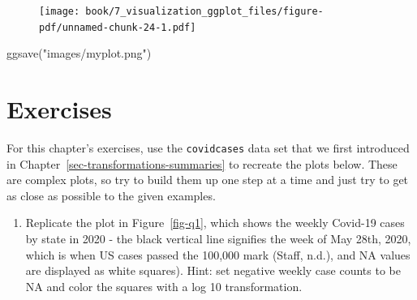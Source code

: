 \documentclass[
  letterpaper,
]{krantz}
\makeatletter
\newenvironment{Shaded}{\begin{snugshade}}{\end{snugshade}}
\newcommand{\FunctionTok}[1]{\textcolor[rgb]{0.28,0.35,0.67}{#1}}
\newcommand{\NormalTok}[1]{\textcolor[rgb]{0.00,0.23,0.31}{#1}}
\newcommand{\StringTok}[1]{\textcolor[rgb]{0.13,0.47,0.30}{#1}}
\providecommand{\tightlist}{%
  \setlength{\itemsep}{0pt}\setlength{\parskip}{0pt}}\usepackage{longtable,booktabs,array}
\newenvironment{kframe}{%
\medskip{}
\setlength{\fboxsep}{.8em}
 \def\at@end@of@kframe{}%
 \ifinner\ifhmode%
  \def\at@end@of@kframe{\end{minipage}}%
  \begin{minipage}{\columnwidth}%
 \fi\fi%
 \def\FrameCommand##1{\hskip\@totalleftmargin \hskip-\fboxsep
 \colorbox{shadecolor}{##1}\hskip-\fboxsep
     \hskip-\linewidth \hskip-\@totalleftmargin \hskip\columnwidth}%
 \MakeFramed {\advance\hsize-\width
   \@totalleftmargin\z@ \linewidth\hsize
   \@setminipage}}%
 {\par\unskip\endMakeFramed%
 \at@end@of@kframe}
\renewenvironment{Shaded}{\begin{kframe}}{\end{kframe}}
\makeatother
\begin{document}
\begin{figure}[H]

{\centering \texttt{[image: book/7\_visualization\_ggplot\_files/figure-pdf/unnamed-chunk-24-1.pdf]}

}

\end{figure}

\begin{Shaded}
\begin{Highlighting}[]
\FunctionTok{ggsave}\NormalTok{(}\StringTok{"images/myplot.png"}\NormalTok{) }
\end{Highlighting}
\end{Shaded}

\hypertarget{exercises-5}{%
\section{Exercises}\label{exercises-5}}

For this chapter's exercises, use the \texttt{covidcases} data set that
we first introduced in Chapter~\ref{sec-transformations-summaries} to
recreate the plots below. These are complex plots, so try to build them
up one step at a time and just try to get as close as possible to the
given examples.

\begin{enumerate}
\def\labelenumi{\arabic{enumi}.}
\tightlist
\item
  Replicate the plot in Figure~\ref{fig-q1}, which shows the weekly
  Covid-19 cases by state in 2020 - the black vertical line signifies
  the week of May 28th, 2020, which is when US cases passed the 100,000
  mark (Staff, n.d.), and NA values are displayed as white squares).
  Hint: set negative weekly case counts to be NA and color the squares
  with a log 10 transformation.
\end{enumerate}
\end{document}
